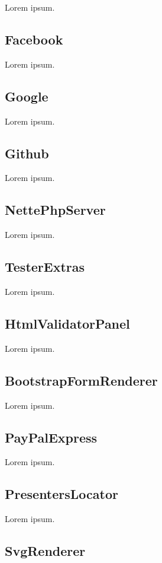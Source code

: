 Lorem ipsum.

\subsection{Facebook}

Lorem ipsum.

\subsection{Google}

Lorem ipsum.

\subsection{Github}

Lorem ipsum.

\subsection{NettePhpServer}

Lorem ipsum.

\subsection{TesterExtras}

Lorem ipsum.

\subsection{HtmlValidatorPanel}

Lorem ipsum.

\subsection{BootstrapFormRenderer}

Lorem ipsum.

\subsection{PayPalExpress}

Lorem ipsum.

\subsection{PresentersLocator}

Lorem ipsum.

\subsection{SvgRenderer}

